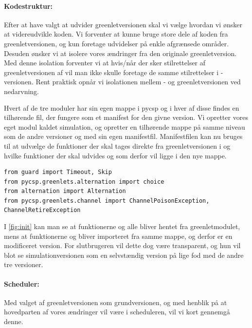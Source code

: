 \paragraph*{Kodestruktur:}  Efter at have valgt at udvider greenletversionen skal vi vælge hvordan vi ønsker at videreudvikle koden. Vi forventer at kunne bruge store dele af koden fra greenletversionen, og kun foretage udvidelser på enkle afgrænsede områder. Desuden ønsker vi at isolere vores ændringer fra den originale greenletversion. Med denne isolation forventer vi at hvis/når der sker stilrettelser af greenletversionen af \pycsp vil man ikke skulle foretage de samme stilrettelser i \des-versionen. 
Rent praktisk opnår vi isolationen mellem \des- og greenletversionen ved nedarvning. 

Hvert af de tre moduler har sin egen mappe i pycsp og i hver af disse findes en tilhørende  fil, der fungere som et manifest for den givne version. Vi opretter vores eget modul kaldet simulation, og opretter en tilhørende mappe på samme niveau som de andre versioner og med sin egen manifestfil. Manifestfilen kan nu bruges til at udvælge de funktioner der skal tages direkte fra greenletversionen i og hvilke funktioner der skal udvides og som derfor vil ligge i den nye mappe.

\begin{lstlisting}[float=hbtp,label=fig:init,caption=Uddrag af \code{\_\_init\_\_.py} for simulationsversionen.]
from guard import Timeout, Skip
from pycsp.greenlets.alternation import choice
from alternation import Alternation
from pycsp.greenlets.channel import ChannelPoisonException, ChannelRetireException
\end{lstlisting}

I \cref{fig:init} kan man se at funktionerne  og  alle bliver hentet fra greenletmodulet, mens at funktionerne  og  bliver importeret fra samme mappe, og derfor er en modificeret version. For slutbrugeren  vil dette dog være transparent, og hun vil blot se simulationversionen som en selvstændig version på lige fod med de andre tre versioner.

\paragraph*{Scheduler:} Med valget af greenletversionen som grundversionen, og med henblik på at hovedparten af vores ændringer vil være i scheduleren, vil vi kort gennemgå denne.

